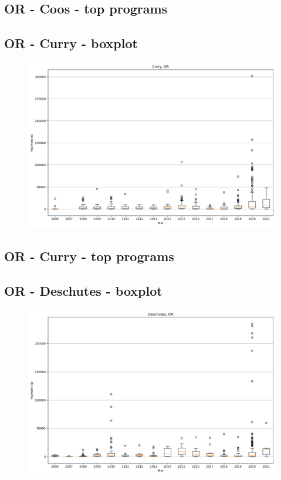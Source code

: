 \subsection*{OR - Coos - top programs}

\newpage
\subsection*{OR - Curry - boxplot}
\begin{figure}[h]
\centering
\includegraphics[width=7in]{../output/boxplots/counties/Curry-OR_boxplot.png}
\end{figure}


\subsection*{OR - Curry - top programs}

\newpage
\subsection*{OR - Deschutes - boxplot}
\begin{figure}[h]
\centering
\includegraphics[width=7in]{../output/boxplots/counties/Deschutes-OR_boxplot.png}
\end{figure}


